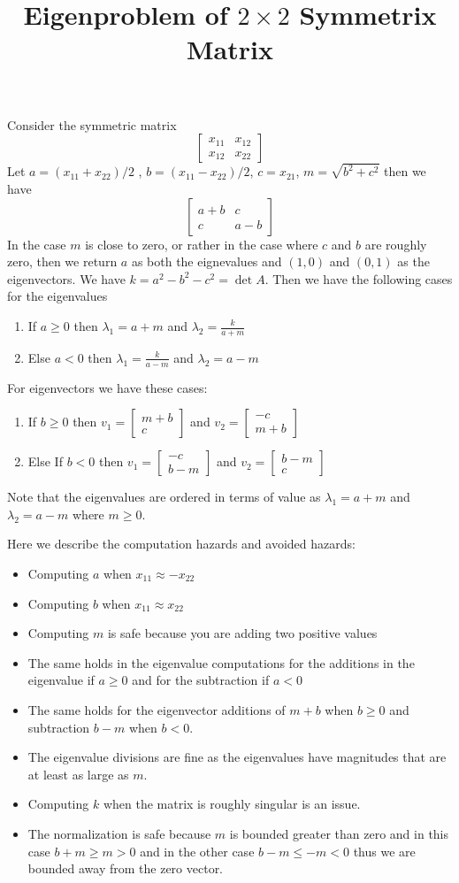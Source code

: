 \documentclass{article}
\begin{document}
\newcommand{\twobytwo}[4]{\left[\begin{array}{cc} #1 & #2 \\ #3 & #4 \end{array} \right]}
\newcommand{\twov}[2]{\left[\begin{array}{c} #1 \\ #2 \end{array} \right]}

\title{Eigenproblem of $2\times 2$ Symmetrix Matrix}
\maketitle

Consider the symmetric matrix
$$\twobytwo{x_{11}}{x_{12}}{x_{12}}{x_{22}}$$
Let $a=(x_{11}+x_{22})/2$ , $b=(x_{11}-x_{22})/2$, $c=x_{21}$, $m=\sqrt{b^2+c^2}$ then we have
$$\twobytwo{a+b}{c}{c}{a-b}$$
In the case $m$ is close to zero, or rather in the case where $c$ and $b$ are roughly zero, then we return $a$ as both the eignevalues and $(1,0)$ and $(0,1)$ as the eigenvectors.
We have $k=a^2-b^2-c^2=\det A$.
Then we have the following cases for the eigenvalues
\begin{enumerate}
\item If $a\ge 0$ then $\lambda_1 = a+m$ and $\lambda_2 = \frac{k}{a+m}$
\item Else $a <  0$ then $\lambda_1 = \frac{k}{a-m}$ and $\lambda_2 = a-m$
\end{enumerate}
For eigenvectors we have these cases:
\begin{enumerate}
\item If $b\ge 0$ then $v_1=\twov{m+b}{c}$ and $v_2=\twov{-c}{m+b}$
\item Else If $b< 0$ then $v_1=\twov{-c}{b-m}$ and $v_2=\twov{b-m}{c}$
\end{enumerate}
Note that the eigenvalues are ordered in terms of value as $\lambda_1 = a+m$  and $\lambda_2 = a-m$  where $m\ge 0$.

Here we describe the computation hazards and avoided hazards:
\begin{itemize}
\item Computing $a$ when $x_{11} \approx -x_{22}$
\item Computing $b$ when $x_{11} \approx x_{22}$
\item Computing $m$ is safe because you are adding two positive values
\item The same holds in the eigenvalue computations for the additions in the eigenvalue if $a\ge 0$ and for the subtraction if $a< 0$
\item The same holds for the eigenvector additions of $m+b$ when $b\ge 0$ and subtraction $b-m$ when $b<0$.
\item The eigenvalue divisions are fine as the eigenvalues have magnitudes that are at least as large as $m$.
\item Computing $k$ when the matrix is roughly singular is an issue.
\item The normalization is safe because $m$ is bounded greater than zero and in this case $b+m\ge m>0$ and in the other case $b-m\le -m<0$ thus we are bounded away from the zero vector.
\end{itemize}
\end{document}

